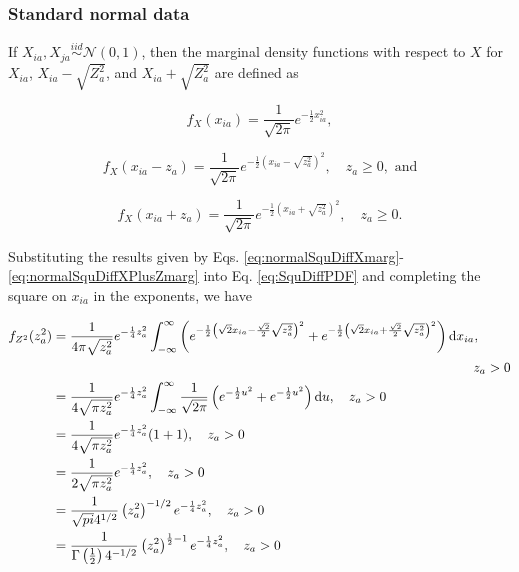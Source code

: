 \documentclass[10pt,letterpaper]{article}\usepackage[]{graphicx}\usepackage[]{color}
\begin{document}
\subsubsection{Standard normal data}

If $X_{ia},X_{ja} \overset{iid}{\sim} \mathcal{N}(0,1)$, then the marginal density functions with respect to $X$ for $X_{ia}$, $X_{ia} - \sqrt{Z^2_a}$, and $X_{ia} + \sqrt{Z^2_a}$ are defined as

\begin{equation}\label{eq:normalSquDiffXmarg}
f_X(x_{ia}) = \frac{1}{\sqrt{2\pi}} e^{-\frac{1}{2}x^2_{ia}},
\end{equation}

\begin{equation}\label{eq:normalSquDiffXMinusZmarg}
f_X(x_{ia} - z_a) = \frac{1}{\sqrt{2\pi}} e^{-\frac{1}{2}\left(x_{ia} - \sqrt{z^2_a}\right)^2}, \quad z_a \geq 0, \text{ and}
\end{equation}

\begin{equation}\label{eq:normalSquDiffXPlusZmarg}
f_X(x_{ia} + z_a) = \frac{1}{\sqrt{2\pi}} e^{-\frac{1}{2}\left(x_{ia} + \sqrt{z^2_a}\right)^2}, \quad z_a \geq 0.
\end{equation}

Substituting the results given by Eqs. \ref{eq:normalSquDiffXmarg}-\ref{eq:normalSquDiffXPlusZmarg} into Eq. \ref{eq:SquDiffPDF} and completing the square on $x_{ia}$ in the exponents, we have

\begin{equation}\label{eq:normalSquDiffPDF}
\begin{aligned}
f_{Z^2}(z^2_a) &= \frac{1}{4\pi\sqrt{z^2_a}} e^{-\frac{1}{4}z^2_a} \int_{-\infty}^{\infty} \left(e^{-\frac{1}{2}\left(\sqrt{2}x_{ia} - \frac{\sqrt{2}}{2}\sqrt{z^2_a}\right)^2} + e^{-\frac{1}{2}\left(\sqrt{2}x_{ia} + \frac{\sqrt{2}}{2}\sqrt{z^2_a}\right)^2} \right) \text{d}x_{ia}, \\
&\hphantom{= } \hspace{10.8cm} z_a > 0 \\
&= \frac{1}{4\sqrt{\pi z^2_a}} e^{-\frac{1}{4}z^2_a}\int_{-\infty}^{\infty} \frac{1}{\sqrt{2\pi}} \left(e^{-\frac{1}{2}u^2} + e^{-\frac{1}{2}u^2}\right) \text{d}u, \quad z_a > 0 \\
&= \frac{1}{4\sqrt{\pi z^2_a}}e^{-\frac{1}{4}z^2_a}(1 + 1), \quad z_a > 0 \\
&= \frac{1}{2\sqrt{\pi z^2_a}}e^{-\frac{1}{4}z^2_a}, \quad z_a > 0 \\
&= \frac{1}{\sqrt{pi} 4^{1/2}} \left(z^2_a\right)^{-1/2} e^{-\frac{1}{4}z^2_a}, \quad z_a > 0 \\
&= \frac{1}{\Gamma\left(\frac{1}{2}\right) 4^{-1/2}} \left(z^2_a\right)^{\frac{1}{2} - 1} e^{-\frac{1}{4}z^2_a}, \quad z_a > 0
\end{aligned}
\end{equation}
\end{document}
